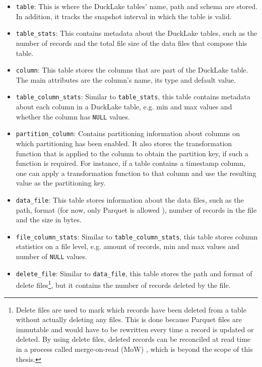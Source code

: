 \begin{itemize}
    \item \verb|table|: This is where the DuckLake tables' name, path and schema are stored. In addition, it tracks the snapshot interval in which the table is valid.
    
    \item \verb|table_stats|: This contains metadata about the DuckLake tables, such as the number of records and the total file size of the data files that compose this table.
    
    \item \verb|column|: This table stores the columns that are part of the DuckLake table. The main attributes are the column's name, its type and default value.
    
    \item \verb|table_column_stats|: Similar to \verb|table_stats|, this table contains metadata about each column in a DuckLake table, e.g. min and max values and whether the column has \verb|NULL| values.
    
    \item \verb|partition_column|: Contains partitioning information about columns on which partitioning has been enabled. It also stores the transformation function that is applied to the column to obtain the partition key, if such a function is required. For instance, if a table contains a timestamp column, one can apply a transformation function to that column and use the resulting value as the partitioning key.    
    
    \item \verb|data_file|: This table stores information about the data files, such as the path, format (for now, only Parquet is allowed \cite{DucklakeDocumentationTables2025}), number of records in the file and the size in bytes.

    \item \verb|file_column_stats|: Similar to \verb|table_column_stats|, this table stores column statistics on a file level, e.g. amount of records, min and max values and number of \verb|NULL| values.

    \item \verb|delete_file|: Similar to \verb|data_file|, this table stores the path and format of delete files\footnote{Delete files are used to mark which records have been deleted from a table without actually deleting any files. This is done because Parquet files are immutable and would have to be rewritten every time a record is updated or deleted. By using delete files, deleted records can be reconciled at read time in a process called merge-on-read (MoW) \cite{paras_jain_analyzing_2023}, which is beyond the scope of this thesis.}, but it contains the number of records deleted by the file.


\end{itemize}
